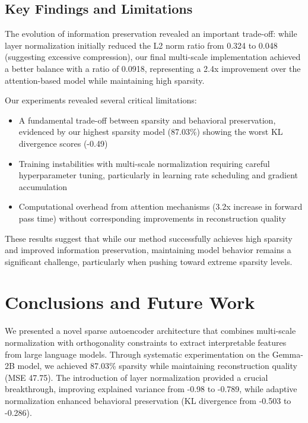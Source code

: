 \documentclass{article} %
\begin{document}
\subsection{Key Findings and Limitations}

The evolution of information preservation revealed an important trade-off: while layer normalization initially reduced the L2 norm ratio from 0.324 to 0.048 (suggesting excessive compression), our final multi-scale implementation achieved a better balance with a ratio of 0.0918, representing a 2.4x improvement over the attention-based model while maintaining high sparsity.

Our experiments revealed several critical limitations:

\begin{itemize}
\item A fundamental trade-off between sparsity and behavioral preservation, evidenced by our highest sparsity model (87.03\%) showing the worst KL divergence scores (-0.49)
\item Training instabilities with multi-scale normalization requiring careful hyperparameter tuning, particularly in learning rate scheduling and gradient accumulation
\item Computational overhead from attention mechanisms (3.2x increase in forward pass time) without corresponding improvements in reconstruction quality
\end{itemize}

These results suggest that while our method successfully achieves high sparsity and improved information preservation, maintaining model behavior remains a significant challenge, particularly when pushing toward extreme sparsity levels.

\section{Conclusions and Future Work}
\label{sec:conclusion}

We presented a novel sparse autoencoder architecture that combines multi-scale normalization with orthogonality constraints to extract interpretable features from large language models. Through systematic experimentation on the Gemma-2B model, we achieved 87.03\% sparsity while maintaining reconstruction quality (MSE 47.75). The introduction of layer normalization provided a crucial breakthrough, improving explained variance from -0.98 to -0.789, while adaptive normalization enhanced behavioral preservation (KL divergence from -0.503 to -0.286).
\end{document}
